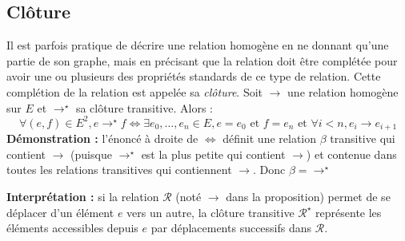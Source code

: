 \documentclass[../../main.tex]{subfiles}
\begin{document}
\subsection{Clôture}
Il est parfois pratique de décrire une relation homogène en ne donnant qu’une
partie de son graphe, mais en précisant que la relation doit être complétée pour
avoir une ou plusieurs des propriétés standards de ce type de relation. Cette complétion de la relation est appelée sa \textit{clôture}.
 Soit $\rightarrow$ une relation homogène sur $E$ et $\rightarrow^\star$ sa clôture transitive. Alors :
$$\forall (e,f)\in E^2, e\rightarrow^\star f \Leftrightarrow \exists e_0, \dots, e_n\in E, e = e_0 \text{ et } f = e_n\text{ et } \forall i < n, e_i\rightarrow e_{i+1}$$
\textbf{Démonstration :} l'énoncé à droite de $\Leftrightarrow$ définit une relation $\beta$ transitive qui contient $\rightarrow$ (puisque $\rightarrow^\star$ est la plus petite qui contient $\rightarrow$) et contenue dans toutes les relations transitives qui contiennent $\rightarrow$. Donc $\beta = \rightarrow^\star$

\textbf{Interprétation :} si la relation $\mathcal{R}$ (noté $\rightarrow$ dans la proposition) permet de se déplacer d'un élément $e$ vers un autre, la clôture transitive $\mathcal{R}^\star$ représente les éléments accessibles depuis $e$ par déplacements successifs dans $\mathcal{R}$.
\end{document}
